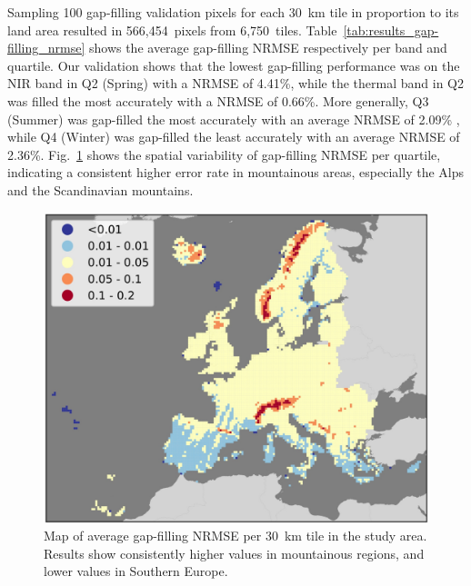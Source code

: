 Sampling 100 gap-filling validation pixels for each 30~km tile in proportion to its land area resulted in 566,454~pixels from 6,750~tiles. Table\@~\ref{tab:results_gap-filling_nrmse} shows the average gap-filling NRMSE respectively per band and quartile. Our validation shows that the lowest gap-filling performance was on the NIR band in Q2 (Spring) with a NRMSE of 4.41\%, while the thermal band in Q2 was filled the most accurately with a NRMSE of 0.66\%. More generally, Q3 (Summer) was gap-filled the most accurately with an average NRMSE of 2.09\% , while Q4 (Winter) was gap-filled the least accurately with an average NRMSE of 2.36\%. Fig.\@~\ref{fig:5_map_gap-filling_nrmse} shows the spatial variability of gap-filling NRMSE per quartile, indicating a consistent higher error rate in mountainous areas, especially the Alps and the Scandinavian mountains.

\begin{figure}[!t]
    \centering
    \includegraphics[width=0.6\linewidth]{figs_02/fig_5_gapfilling_accuracy_landsat.png}
    \caption{Map of average gap-filling NRMSE per 30~km tile in the study area. Results show consistently higher values in mountainous regions, and lower values in Southern Europe.}
    \label{fig:5_map_gap-filling_nrmse}
\end{figure}

